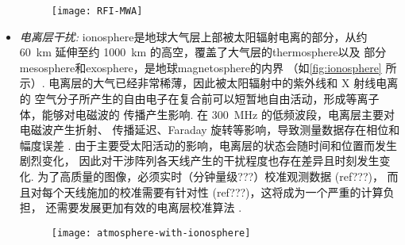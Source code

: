 \begin{itemize}
\begin{figure}[tbp]
  \centering
  \texttt{[image: RFI-MWA]}
  \label{fig:rfi-mwa}
\end{figure}

\item
\emph{电离层干扰:}
\acf{ionosphere}是地球大气层上部被太阳辐射电离的部分，从约 \SI{60}{\km}
延伸至约 \SI{1000}{\km} 的高空，覆盖了大气层的\ac{thermosphere}以及
部分\ac{mesosphere}和\ac{exosphere}，是地球\ac{magnetosphere}的内界
（如\autoref{fig:ionosphere} 所示）.
电离层的大气已经非常稀薄，因此被太阳辐射中的紫外线和 X 射线电离的
空气分子所产生的自由电子在复合前可以短暂地自由活动，形成等离子体，能够对电磁波的
传播产生影响.
在 \SI{300}{\MHz} 的低频波段，电离层主要对电磁波产生折射、
传播延迟、Faraday 旋转等影响，导致测量数据存在相位和幅度误差
\cite{intema2009,thompson2017}.
由于主要受太阳活动的影响，电离层的状态会随时间和位置而发生剧烈变化，
因此对干涉阵列各天线产生的干扰程度也存在差异且时刻发生变化.
为了高质量的图像，必须实时（分钟量级???）校准观测数据 (ref???)，
而且对每个天线施加的校准需要有针对性 (ref???)，这将成为一个严重的计算负担，
还需要发展更加有效的电离层校准算法 \cite{intema2009,deGasperin2018}.

\begin{figure}[tbp]
  \centering
  \texttt{[image: atmosphere-with-ionosphere]}
  \label{fig:ionosphere}
\end{figure}


\end{itemize}
